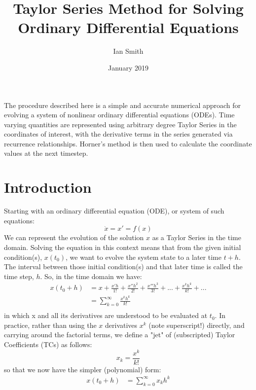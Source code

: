 \documentclass[11pt]{article}
\title{\textbf{Taylor Series Method for Solving Ordinary Differential Equations}}
\author{Ian Smith}
\date{January 2019}
\begin{document}
\maketitle

\abstract
The procedure described here is a simple and accurate numerical approach for evolving a system of nonlinear ordinary differential equations (ODEs).
Time varying quantities are represented using arbitrary degree Taylor Series in the coordinates of interest, with the derivative terms in the series generated via recurrence relationships.
Horner's method is then used to calculate the coordinate values at the next timestep. 

\section{Introduction}
Starting with an ordinary differential equation (ODE), or system of such equations:
\begin{equation}
\dot{x} = x' = f(x)
\end{equation}
We can represent the evolution of the solution $x$ as a Taylor Series in the time domain.
Solving the equation in this context means that from the given initial condition(s), $x(t_0)$, we want to evolve the system state to a later time $t + h$.
The interval between those initial condition(s) and that later time is called the time step, $h$.
So, in the time domain we have:
\begin{equation}
\begin{aligned}
x(t_0 + h) &= x + \frac{x'h}{1!} + \frac{x''h^2}{2!} + \frac{x'''h^3}{3!} + ... + \frac{x^kh^k}{k!} + ...\\
&= \sum_{k=0}^{\infty} \frac{x^kh^k}{k!}\\
\end{aligned}
\end{equation}
in which x and all its derivatives are understood to be evaluated at $t_0$.
In practice, rather than using the $x$ derivatives $x^k$ (note superscript!) directly, and carrying around the factorial terms, we define a "jet" of (subscripted) Taylor Coefficients (TCs) as follows:
\begin{equation}
x_k = \frac{x^k}{k!}
\end{equation}
so that we now have the simpler (polynomial) form:
\begin{equation}
\begin{aligned}
x(t_0 + h) &= \sum_{k=0}^{\infty} x_kh^k
\end{aligned}
\end{equation}
\end{document}
